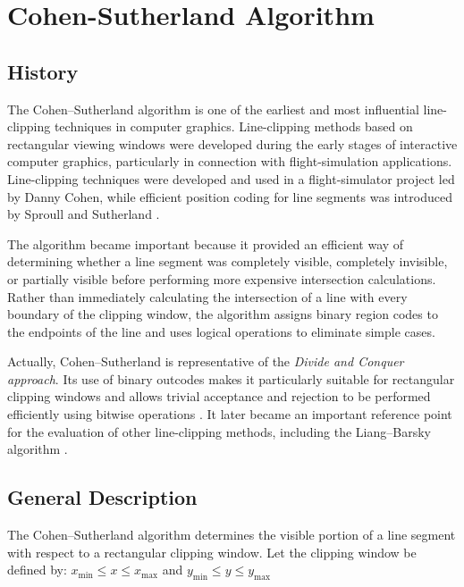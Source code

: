 
\section{Cohen-Sutherland Algorithm}

\subsection{History}

The Cohen--Sutherland algorithm is one of the earliest and most influential line-clipping techniques in computer graphics. Line-clipping methods based on rectangular viewing windows were developed during the early stages of interactive computer graphics, particularly in connection with flight-simulation
applications. Line-clipping techniques were developed and used in a flight-simulator project led by Danny Cohen, while efficient position coding for line segments was introduced by Sproull and
Sutherland \cite{MatthesDrakopoulos2022}.

The algorithm became important because it provided an efficient way of determining whether a line segment was completely visible, completely invisible, or partially visible before performing more expensive intersection calculations. Rather than immediately calculating the intersection of a line with every boundary of the clipping window, the algorithm assigns binary region codes to the endpoints of the line and uses logical operations to eliminate simple cases.

Actually, Cohen--Sutherland is representative of the \textit{Divide and Conquer approach}. Its use of binary outcodes makes it particularly suitable for rectangular clipping windows and allows trivial acceptance and rejection to be performed efficiently using bitwise operations \cite{MatthesDrakopoulos2022,Clipping6thSem}. It later became an important reference point for the evaluation of other line-clipping methods, including the Liang--Barsky algorithm \cite{LiangBarsky1984}.


\subsection{General Description}

The Cohen--Sutherland algorithm determines the visible portion of a line segment with respect to a rectangular clipping window. Let the clipping window be defined by: $x_{\min} \leq x \leq x_{\max}$ and $y_{\min} \leq y \leq y_{\max}$

